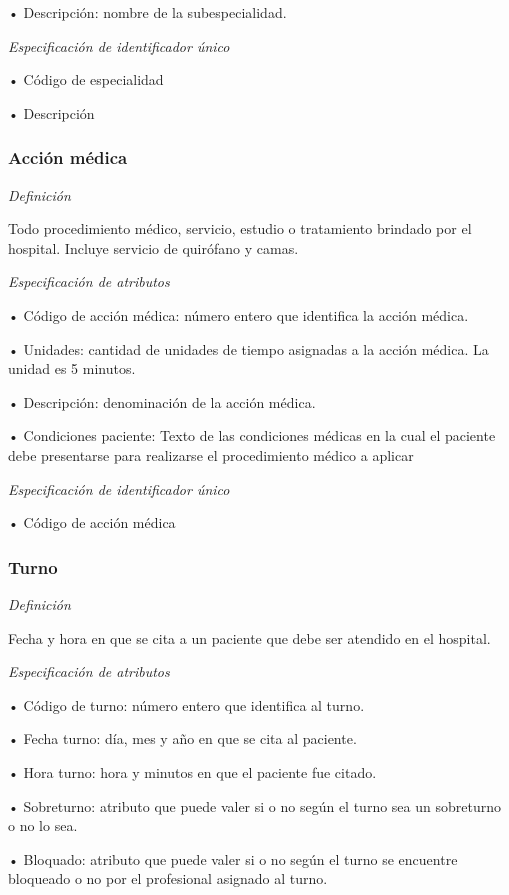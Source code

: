 \documentclass[a4paper,11pt]{article}
\begin{document}
• Descripción: nombre de la subespecialidad.

\textit{Especificación de identificador único}

• Código de especialidad

• Descripción\label{HToc293405811}

\subsubsection{\textbf{Acción médica}}

\textit{Definición}

Todo procedimiento médico, servicio, estudio o tratamiento brindado por el hospital. 
Incluye servicio de quirófano y camas.

\textit{Especificación de atributos}

• Código de acción médica: número entero que identifica la acción médica.

• Unidades: cantidad de unidades de tiempo asignadas a la acción médica. La 
unidad es 5 minutos.

• Descripción: denominación de la acción médica.

• Condiciones paciente: Texto de las condiciones médicas en la cual el paciente 
debe presentarse para realizarse el procedimiento médico a aplicar

\textit{Especificación de identificador único}

• Código de acción médica\label{HToc293405812}

\subsubsection{\textbf{Turno}}

\textit{Definición}

Fecha y hora en que se cita a un paciente que debe ser atendido en el hospital.

\textit{Especificación de atributos}

• Código de turno: número entero que identifica al turno.

• Fecha turno: día, mes y año en que se cita al paciente.

• Hora turno: hora y minutos en que el paciente fue citado.

• Sobreturno: atributo que puede valer si o no según el turno sea un sobreturno 
o no lo sea.

• Bloquado: atributo que puede valer si o no según el turno se encuentre bloqueado 
o no por el profesional asignado al turno.
\end{document}
